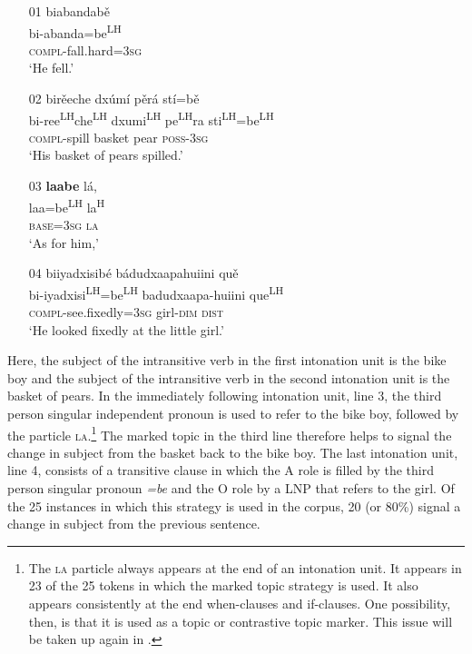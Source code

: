 \ea\label{markedIPR1}
\begin{itemize}
\item[01]
\glll biabandab\v{e} \\
bi-abanda=be\textsuperscript{LH} \\
\textsc{compl}-fall.hard=3\textsc{sg} \\
\glt `He fell.'


\item[02]
\glll bir\v{e}eche dx\'{u}m\'{i} p\v{e}r\'{a} st\'{i}=b\v{e} \\
bi-ree\textsuperscript{LH}che\textsuperscript{LH} dxumi\textsuperscript{LH} pe\textsuperscript{LH}ra sti\textsuperscript{LH}=be\textsuperscript{LH} \\
\textsc{compl}-spill basket pear \textsc{poss}-3\textsc{sg} \\
\glt `His basket of pears spilled.'


\item[03]
\glll \textbf{laabe} l\'{a}, \\
laa=be\textsuperscript{LH} la\textsuperscript{H} \\
\textsc{base}=3\textsc{sg} \textsc{la} \\
\glt `As for him,'


\item[04]
\glll biiyadxisib\'{e} b\'{a}dudxaapahuiini qu\v{e} \\
bi-iyadxisi\textsuperscript{LH}=be\textsuperscript{LH} badudxaapa-huiini que\textsuperscript{LH} \\
\textsc{compl}-see.fixedly=3\textsc{sg} girl-\textsc{dim} \textsc{dist} \\
\glt `He looked fixedly at the little girl.'
\end{itemize}
\z
Here, the subject of the intransitive verb in the first intonation unit is the bike boy and the subject of the intransitive verb in the second intonation unit is the basket of pears. In the immediately following intonation unit, line 3, the third person singular independent pronoun is used to refer to the bike boy, followed by the particle \textsc{la}.\footnote{The \textsc{la} particle always appears at the end of an intonation unit. It appears in 23 of the 25 tokens in which the marked topic strategy is used. It also appears consistently at the end when-clauses and if-clauses. One possibility, then, is that it is used as a topic or contrastive topic marker. This issue will be taken up again in .} The marked topic in the third line therefore helps to signal the change in subject from the basket back to the bike boy. The last intonation unit, line 4, consists of a transitive clause in which the A role is filled by the third person singular pronoun \textit{=be} and the O role by a LNP that refers to the girl. Of the 25 instances in which this strategy is used in the corpus, 20 (or 80{\%}) signal a change in subject from the previous sentence. 


